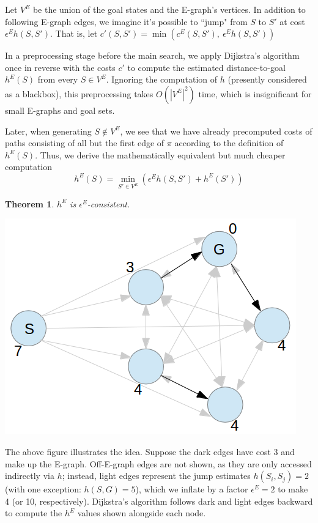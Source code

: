 \documentclass[letterpaper]{article}
\newtheorem{thm}{Theorem}
\begin{document}
Let $V^E$ be the union of the goal states and the E-graph's vertices.
In addition to following E-graph edges, we imagine it's possible to ``jump" from $S$ to $S'$ at cost $\epsilon^E h(S,S')$.
That is, let $c'(S,S') = \min\left(c^E(S,S'),~\epsilon^E h(S,S')\right)$


In a preprocessing stage before the main search, we apply Dijkstra's algorithm once in reverse with the costs $c'$ to compute the estimated distance-to-goal $h^E(S)$ from every $S\in V^E$. Ignoring the computation of $h$ (presently considered as a blackbox), this preprocessing takes $O(|V^E|^2)$ time, which is insignificant for small E-graphs and goal sets.

Later, when generating $S \notin V^E$, we see that we have already precomputed costs of paths consisting of all but the first edge of $\pi$ according to the definition of $h^E(S)$. Thus, we derive the mathematically equivalent but much cheaper computation
\[h^E(S) = \min_{S'\in V^E} \left(\epsilon^E h(S,S') + h^E(S')\right)\]

\begin{thm}$h^E$ is $\epsilon^E$-consistent. \cite{phillips2012graphs}\end{thm}

\includegraphics[scale=0.4]{Pentagon.png}

The above figure illustrates the idea. Suppose the dark edges have cost 3 and make up the E-graph. Off-E-graph edges are not shown, as they are only accessed indirectly via $h$; instead, light edges represent the jump estimates $h(S_i,S_j) = 2$ (with one exception: $h(S,G) = 5$), which we inflate by a factor $\epsilon^E=2$ to make 4 (or 10, respectively). Dijkstra's algorithm follows dark and light edges backward to compute the $h^E$ values shown alongside each node.
\end{document}
